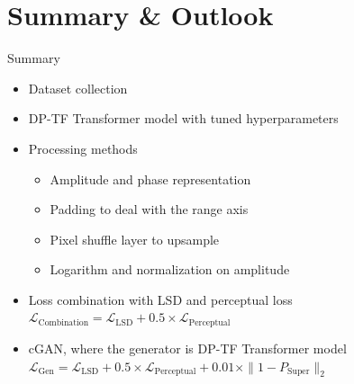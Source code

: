 \documentclass{beamer}
\newcounter{section}
\begin{document}
\section{Summary \& Outlook}
\setcounter{section}{5}
\setcounter{figure}{0}

\begin{frame}{Summary}
    \begin{itemize}
        \item Dataset collection
        \vspace{0.5\baselineskip}
        \item DP-TF Transformer model with tuned hyperparameters
        \vspace{0.5\baselineskip}
        \item Processing methods
        \begin{itemize}
            \vspace{0.3\baselineskip}
            \item Amplitude and phase representation
            \vspace{0.3\baselineskip}
            \item Padding to deal with the range axis
            \vspace{0.3\baselineskip}
            \item Pixel shuffle layer to upsample
            \vspace{0.3\baselineskip}
            \item Logarithm and normalization on amplitude
        \end{itemize}
        \vspace{0.5\baselineskip}
        \item Loss combination with LSD and perceptual loss 
        \vspace{0.3\baselineskip}
        $\mathcal{L}_{\text{Combination}} = \mathcal{L}_{\text{LSD}} + 0.5 \times \mathcal{L}_{\text{Perceptual}}$
        \vspace{0.5\baselineskip}
        \item cGAN, where the generator is DP-TF Transformer model 
        \vspace{0.3\baselineskip}
        $\mathcal{L}_{\text{Gen}} = \mathcal{L}_{\text{LSD}} + 0.5 \times \mathcal{L}_{\text{Perceptual}} + 0.01 \times \| 1 - P_{\text{Super}} \|_{2}$
    \end{itemize}
\end{frame}
\end{document}

